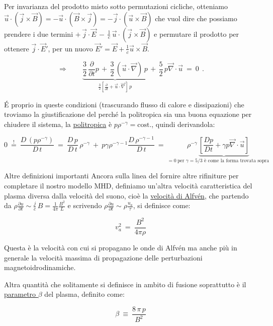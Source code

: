 Per invarianza del prodotto misto sotto permutazioni cicliche, otteniamo $\vec u\cdot(\vec j\times \vec B)=-\vec u\cdot(\vec B \times \vec j)=-\vec j\cdot (\vec u\times \vec B)$ che vuol dire che possiamo prendere i due termini $+\, \vec j\cdot \vec E\, -\, \frac{1}{c}\,\vec u\cdot \left(\vec j\times \vec B \right)$ e permutare il prodotto per ottenere $\vec j\cdot\vec E'$, per un nuovo $\vec E'=\vec E + \frac{1}{c}\vec u\times \vec B$.

\[\Rightarrow\quad \quad \underset{ \frac{3}{2} \left[\frac{\partial}{\partial t}+\vec u\cdot \vec \nabla\right]\, p }{\underbrace{\frac{3}{2}\, \frac{\partial}{\partial t} p\, +\, \frac{3}{2}\, \left(\vec u\cdot \vec \nabla\right)\, p}}\, +\, \frac{5}{2}\, p\vec \nabla\cdot \vec u\ =\ 0\ \ .\]

\'E proprio in queste condizioni (trascurando flusso di calore e dissipazioni) che troviamo la giustificazione del perché la politropica sia una buona equazione per chiudere il sistema, la \underline{politropica} è $\boxed{p\rho^{-\gamma}=\text{cost.}}$, quindi derivandola:

\[ 0\ \overset{!}{=}\ \frac{D\, \left(p\rho^{-\gamma}\right)}{D\, t}\ =\ \frac{D\, p}{D\, t}\, \rho^{-\gamma} \ +\ p\gamma \rho^{-\gamma -1} \frac{D\, \rho^{-\gamma -1}}{D\, t}\ =\ \underset{=0\ \text{per $\gamma=5/3$ è come la forma trovata sopra}}{\rho^{-\gamma}\, \underbrace{\left[\frac{Dp}{Dt}+\gamma p\vec\nabla\cdot\vec u\right]}}\]

%
%
\vspace{0.5cm}
\begin{approfondimento}{Altre definizioni importanti}
	Ancora sulla linea del fornire altre rifiniture per completare il nostro modello MHD, definiamo un'altra velocità caratteristica del plasma diversa dalla velocità del suono, cioè la \underline{velocità di Alfvén}, che partendo da $\rho \frac{\partial u}{\partial t}\sim \frac{j}{c}\, B= \frac{1}{4\pi}\frac{B^2}{L}$ e scrivendo $\rho \frac{\partial u}{\partial t}\sim \rho \frac{u_a}{\tau}$, si definisce come:
	
	\begin{equation}
		\label{velocità di Alfvén}
		\boxed{\,v_a^2\ =\ \frac{B^2}{4\pi \rho}\,}
	\end{equation}
	
	Questa è la velocità con cui si propagano le onde di Alfvén ma anche più in generale la velocità massima di propagazione delle perturbazioni magnetoidrodinamiche.
	
	Altra quantità che solitamente si definisce in ambito di fusione soprattutto è il \underline{parametro $\beta$} del plasma, definito come:
	
	\begin{equation}
		\label{beta parameter}
		\boxed{\,\beta\ \equiv\ \frac{8\, \pi\, p}{B^2}\,}
	\end{equation}
\end{approfondimento}



